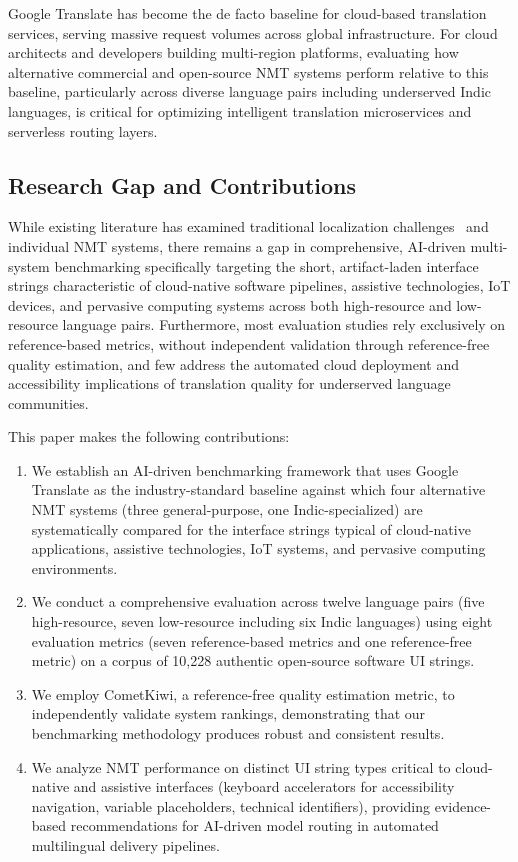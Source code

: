 \documentclass[pdflatex,sn-mathphys-num]{sn-jnl}
\begin{document}
Google Translate has become the de facto baseline for cloud-based translation services, serving massive request volumes across global infrastructure. For cloud architects and developers building multi-region platforms, evaluating how alternative commercial and open-source NMT systems perform relative to this baseline, particularly across diverse language pairs including underserved Indic languages, is critical for optimizing intelligent translation microservices and serverless routing layers.

\subsection{Research Gap and Contributions}

While existing literature has examined traditional localization challenges~\cite{31,32,33} and individual NMT systems, there remains a gap in comprehensive, AI-driven multi-system benchmarking specifically targeting the short, artifact-laden interface strings characteristic of cloud-native software pipelines, assistive technologies, IoT devices, and pervasive computing systems across both high-resource and low-resource language pairs. Furthermore, most evaluation studies rely exclusively on reference-based metrics, without independent validation through reference-free quality estimation, and few address the automated cloud deployment and accessibility implications of translation quality for underserved language communities.

This paper makes the following contributions:

\begin{enumerate}
\item We establish an AI-driven benchmarking framework that uses Google Translate as the industry-standard baseline against which four alternative NMT systems (three general-purpose, one Indic-specialized) are systematically compared for the interface strings typical of cloud-native applications, assistive technologies, IoT systems, and pervasive computing environments.
\item We conduct a comprehensive evaluation across twelve language pairs (five high-resource, seven low-resource including six Indic languages) using eight evaluation metrics (seven reference-based metrics and one reference-free metric) on a corpus of 10,228 authentic open-source software UI strings.
\item We employ CometKiwi, a reference-free quality estimation metric, to independently validate system rankings, demonstrating that our benchmarking methodology produces robust and consistent results.
\item We analyze NMT performance on distinct UI string types critical to cloud-native and assistive interfaces (keyboard accelerators for accessibility navigation, variable placeholders, technical identifiers), providing evidence-based recommendations for AI-driven model routing in automated multilingual delivery pipelines.
\end{enumerate}
\end{document}
